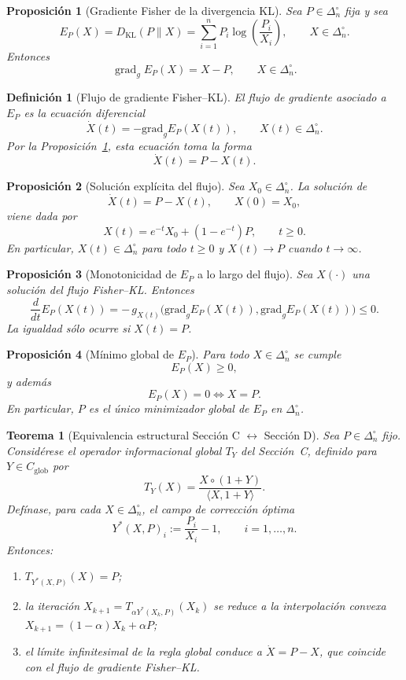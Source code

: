 ﻿\documentclass[12pt]{article}
\newtheorem{definicion}{Definición}[section]
\newtheorem{proposicion}{Proposición}[section]
\newtheorem{teorema}{Teorema}[section]
\begin{document}
\begin{proposicion}[Gradiente Fisher de la divergencia KL]\label{prop:gradKL}
Sea $P\in\Delta_n^\circ$ fija y sea
\[
E_P(X)=D_{\mathrm{KL}}(P\|X)=\sum_{i=1}^n P_i \log\!\left(\frac{P_i}{X_i}\right),
\qquad X\in\Delta_n^\circ.
\]
Entonces
\[
\operatorname{grad}_g E_P(X)=X-P,
\qquad X\in\Delta_n^\circ.
\]
\end{proposicion}

\begin{definicion}[Flujo de gradiente Fisher--KL]\label{def:flujoFisherKL}
El flujo de gradiente asociado a $E_P$ es la ecuación diferencial
\[
\dot X(t)=-\mathrm{grad}_gE_P(X(t)),
\qquad
X(t)\in\Delta_n^\circ.
\]
Por la Proposición~\ref{prop:gradKL}, esta ecuación toma la forma
\[
\dot X(t)=P-X(t).
\]
\end{definicion}

\begin{proposicion}[Solución explícita del flujo]\label{prop:solucionExplicita}
Sea $X_0\in\Delta_n^\circ$. La solución de
\[
\dot X(t)=P-X(t),\qquad X(0)=X_0,
\]
viene dada por
\[
X(t)=e^{-t}X_0+(1-e^{-t})P,\qquad t\ge 0.
\]
En particular, $X(t)\in\Delta_n^\circ$ para todo $t\ge 0$ y $X(t)\to P$ cuando $t\to\infty$.
\end{proposicion}

\begin{proposicion}[Monotonicidad de $E_P$ a lo largo del flujo]\label{prop:Hteorema}
Sea $X(\cdot)$ una solución del flujo Fisher--KL. Entonces
\[
\frac{d}{dt}E_P(X(t))
=
-\,g_{X(t)}\!\bigl(\mathrm{grad}_gE_P(X(t)),\mathrm{grad}_gE_P(X(t))\bigr)
\le 0.
\]
La igualdad sólo ocurre si $X(t)=P$.
\end{proposicion}

\begin{proposicion}[Mínimo global de $E_P$]\label{prop:minimoGlobalKL}
Para todo $X\in\Delta_n^\circ$ se cumple
\[
E_P(X)\ge 0,
\]
y además
\[
E_P(X)=0\iff X=P.
\]
En particular, $P$ es el único minimizador global de $E_P$ en $\Delta_n^\circ$.
\end{proposicion}

\begin{teorema}[Equivalencia estructural Sección C $\leftrightarrow$ Sección D]\label{teo:equivalenciaCD}
Sea $P\in\Delta_n^\circ$ fijo. Considérese el operador informacional global $T_Y$ del Sección~C, definido para $Y\in C_{\mathrm{glob}}$ por
\[
T_Y(X)=\frac{X\circ(1+Y)}{\langle X,1+Y\rangle}.
\]
Defínase, para cada $X\in\Delta_n^\circ$, el campo de corrección óptima
\[
Y^*(X,P)_i:=\frac{P_i}{X_i}-1,\qquad i=1,\dots,n.
\]
Entonces:
\begin{enumerate}
    \item $T_{Y^*(X,P)}(X)=P$;
    \item la iteración $X_{k+1}=T_{\alpha Y^*(X_k,P)}(X_k)$ se reduce a la interpolación convexa $X_{k+1}=(1-\alpha)X_k+\alpha P$;
    \item el límite infinitesimal de la regla global conduce a $\dot X=P-X$, que coincide con el flujo de gradiente Fisher--KL.
\end{enumerate}
\end{teorema}
\end{document}
